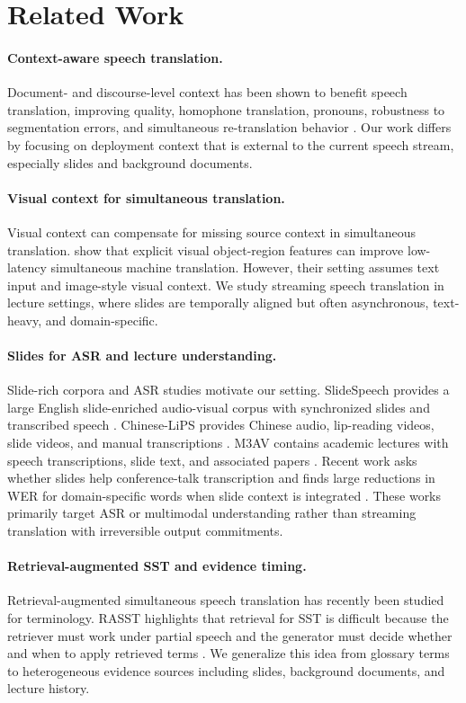 \section{Related Work}

\paragraph{Context-aware speech translation.}
Document- and discourse-level context has been shown to benefit speech translation, improving quality, homophone translation, pronouns, robustness to segmentation errors, and simultaneous re-translation behavior \citep{zhang2021beyond}.  Our work differs by focusing on deployment context that is external to the current speech stream, especially slides and background documents.

\paragraph{Visual context for simultaneous translation.}
Visual context can compensate for missing source context in simultaneous translation.  \citet{caglayan2020simultaneous} show that explicit visual object-region features can improve low-latency simultaneous machine translation.  However, their setting assumes text input and image-style visual context.  We study streaming speech translation in lecture settings, where slides are temporally aligned but often asynchronous, text-heavy, and domain-specific.

\paragraph{Slides for ASR and lecture understanding.}
Slide-rich corpora and ASR studies motivate our setting.  SlideSpeech provides a large English slide-enriched audio-visual corpus with synchronized slides and transcribed speech \citep{wang2023slidespeech}.  Chinese-LiPS provides Chinese audio, lip-reading videos, slide videos, and manual transcriptions \citep{zhao2025chineselips}.  M3AV contains academic lectures with speech transcriptions, slide text, and associated papers \citep{chen2024m3av}.  Recent work asks whether slides help conference-talk transcription and finds large reductions in WER for domain-specific words when slide context is integrated \citep{sinhamahapatra2025slides}.  These works primarily target ASR or multimodal understanding rather than streaming translation with irreversible output commitments.

\paragraph{Retrieval-augmented SST and evidence timing.}
Retrieval-augmented simultaneous speech translation has recently been studied for terminology.  RASST highlights that retrieval for SST is difficult because the retriever must work under partial speech and the generator must decide whether and when to apply retrieved terms \citep{luo2026rasst}.  We generalize this idea from glossary terms to heterogeneous evidence sources including slides, background documents, and lecture history.


